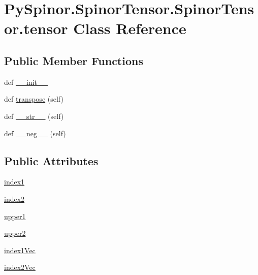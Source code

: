 \hypertarget{class_py_spinor_1_1_spinor_tensor_1_1_spinor_tensor_1_1tensor}{}\section{Py\+Spinor.\+Spinor\+Tensor.\+Spinor\+Tensor.\+tensor Class Reference}
\label{class_py_spinor_1_1_spinor_tensor_1_1_spinor_tensor_1_1tensor}
\subsection*{Public Member Functions}
\begin{DoxyCompactItemize}
\item 
def \hyperlink{class_py_spinor_1_1_spinor_tensor_1_1_spinor_tensor_1_1tensor_a191af214de745277603298dc42625ae2}{\+\_\+\+\_\+init\+\_\+\+\_\+}
\item 
def \hyperlink{class_py_spinor_1_1_spinor_tensor_1_1_spinor_tensor_1_1tensor_a165e0526ba65d8eec4af5b320c63b6da}{transpose} (self)
\item 
def \hyperlink{class_py_spinor_1_1_spinor_tensor_1_1_spinor_tensor_1_1tensor_ab4d4261e947f70e99db486113327f91f}{\+\_\+\+\_\+str\+\_\+\+\_\+} (self)
\item 
def \hyperlink{class_py_spinor_1_1_spinor_tensor_1_1_spinor_tensor_1_1tensor_afe16a6e9a71021e5eb73875dce3db69d}{\+\_\+\+\_\+neg\+\_\+\+\_\+} (self)
\end{DoxyCompactItemize}
\subsection*{Public Attributes}
\begin{DoxyCompactItemize}
\item 
\hyperlink{class_py_spinor_1_1_spinor_tensor_1_1_spinor_tensor_1_1tensor_a0b9787504a8d1bd666893308b7ecbf8b}{index1}
\item 
\hyperlink{class_py_spinor_1_1_spinor_tensor_1_1_spinor_tensor_1_1tensor_a7337acd6c8b8e7bdc4bcd51046b33851}{index2}
\item 
\hyperlink{class_py_spinor_1_1_spinor_tensor_1_1_spinor_tensor_1_1tensor_a12de0d89eeef43572406df201e26ab66}{upper1}
\item 
\hyperlink{class_py_spinor_1_1_spinor_tensor_1_1_spinor_tensor_1_1tensor_ac7c0b955050298326d2b805f6bcaf23a}{upper2}
\item 
\hyperlink{class_py_spinor_1_1_spinor_tensor_1_1_spinor_tensor_1_1tensor_a170d33bb8588b0fee30a3b4a62d63d24}{index1\+Vec}
\item 
\hyperlink{class_py_spinor_1_1_spinor_tensor_1_1_spinor_tensor_1_1tensor_aec31a15cb9764166022dd2af292521ef}{index2\+Vec}
\end{DoxyCompactItemize}


